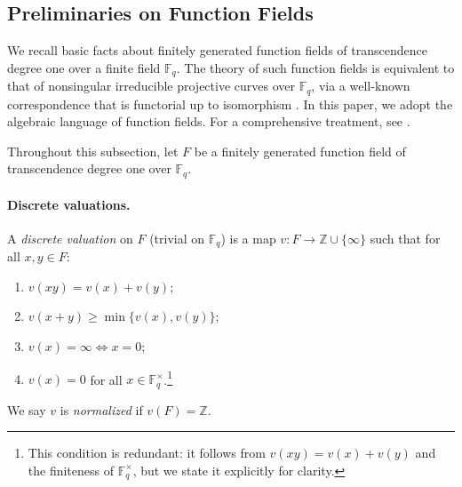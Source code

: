 \documentclass[11pt]{article}
\newcommand{\F}{\mathbb{F}}
\newcommand{\Z}{\mathbb{Z}}
\begin{document}




\subsection{Preliminaries on Function Fields}

We recall basic facts about finitely generated function fields of transcendence degree one over a finite field $\F_q$. The theory of such function fields is equivalent to that of nonsingular irreducible projective curves over $\F_q$, via a well-known correspondence that is functorial up to isomorphism \cite[Section~1.6]{har77}. In this paper, we adopt the algebraic language of function fields. For a comprehensive treatment, see \cite{Sti09}.

Throughout this subsection, let $F$ be a finitely generated function field of transcendence degree one over $\F_q$.

\paragraph{Discrete valuations.}
A \emph{discrete valuation} on $F$ (trivial on $\F_q$) is a map $v:F\to \mathbb{Z}\cup\{\infty\}$
such that for all $x,y\in F$:
\begin{enumerate}
\item $v(xy)=v(x)+v(y)$;
\item $v(x+y)\ge \min\{v(x),v(y)\}$;
\item $v(x)=\infty \iff x=0$;
\item $v(x)=0$ for all $x\in\F_q^\times$.\footnote{This condition is redundant: it follows from $v(xy)=v(x)+v(y)$ and the finiteness of $\F_q^\times$, but we state it explicitly for clarity.}
\end{enumerate}
We say $v$ is \emph{normalized} if $v(F)=\Z$.
\end{document}
